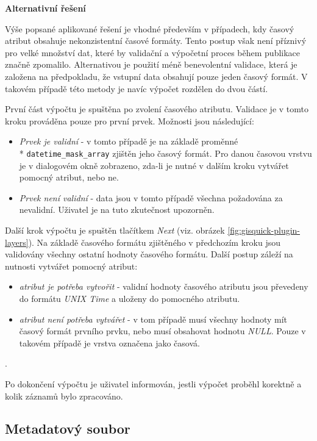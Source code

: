 \bigskip
\noindent
\textbf{Alternativní řešení}

Výše popsané aplikované řešení je vhodné především v případech, kdy časový
atribut obsahuje nekonzistentní časové formáty. Tento postup však není 
příznivý pro velké množství dat, které by validační a výpočetní proces 
během publikace značně zpomalilo. Alternativou je použití méně benevolentní 
validace, která je založena na předpokladu, že vstupní data obsahují pouze jeden časový 
formát. V takovém případě této metody je navíc výpočet rozdělen do dvou částí. 

První část výpočtu je spuštěna po zvolení časového atributu. Validace je
v tomto kroku prováděna pouze pro první prvek. Možnosti jsou následující:

\begin{itemize}
	\item\textit{Prvek je validní} - v tomto případě je na základě proměnné
	\\* \verb|datetime_mask_array| zjištěn jeho časový formát. Pro danou časovou 
	vrstvu je v dialogovém okně zobrazeno, zda-li je nutné v dalším 
	kroku vytvářet pomocný atribut, nebo ne.
	\item\textit{Prvek není validní} - data jsou v tomto případě všechna 
	požadována za nevalidní. Uživatel je na tuto zkutečnost upozorněn.
\end{itemize}

Další krok výpočtu je spuštěn tlačítkem \textit{Next} (viz. obrázek 
\ref{fig:gisquick-plugin-layers}). Na základě časového formátu zjištěného
v předchozím kroku jsou validovány všechny ostatní hodnoty časového 
formátu. Další postup záleží na nutnosti vytvářet pomocný atribut:

\begin{itemize}
	\item\textit{atribut je potřeba vytvořit} - validní hodnoty časového 
	atributu jsou převedeny do formátu \textit{UNIX Time} a uloženy do 
	pomocného atributu.
	\item\textit{atribut není potřeba vytvářet} - v tom případě musí 
	všechny hodnoty mít časový formát prvního prvku, nebo musí 
	obsahovat hodnotu \textit{NULL}. Pouze v takovém případě je 
	vrstva označena jako časová.
\end{itemize}.

Po dokončení výpočtu je uživatel informován, jestli výpočet proběhl
korektně a kolik záznamů bylo zpracováno.	

\subsection{Metadatový soubor}
\label{sssec:metadata}

